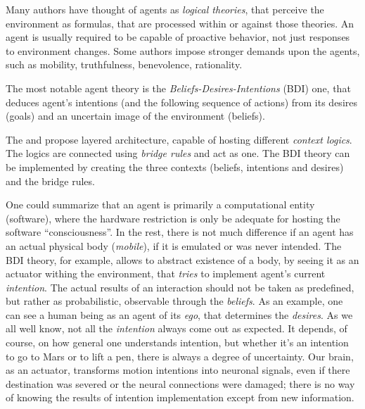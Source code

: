 \documentclass[ThesisDoc]{subfiles}
\begin{document}
Many authors have thought of agents as \emph{logical theories}, that perceive
the environment as formulas, that are processed within or against those theories.
An agent is usually required to be capable of proactive behavior, not
just responses to environment changes. Some authors impose stronger demands upon
the agents, such as mobility, truthfulness, benevolence, rationality.

The most notable agent theory is the \emph{Beliefs-Desires-Intentions} (BDI) one,
that deduces agent's intentions (and the following sequence of actions)
from its desires (goals) and an uncertain image of the environment (beliefs).


The \cite{UAB-Thesis} and \cite{PNoriega} propose layered architecture,
capable of hosting different \emph{context logics}.
The logics are connected using \emph{bridge rules} and act as one.
The BDI theory can be implemented by creating the three contexts
(beliefs, intentions and desires) and the bridge rules.

\todo{}


\bigskip
\medskip

\noindent
One could summarize that an agent is primarily a computational entity (software),
where the hardware restriction is only be adequate for hosting the software
``consciousness''. In the rest, there is not much difference if an agent has
an actual physical body (\emph{mobile}), if it is emulated or was never intended.
The BDI theory, for example, allows to abstract existence of a body,
by seeing it as an actuator withing the environment, that \emph{tries} to
implement agent's current \emph{intention}.
The actual results of an interaction should not be taken as predefined, but rather
as probabilistic, observable through the \emph{beliefs}. As an example, one can
see a human being as an agent of its \emph{ego}, that determines the \emph{desires}.
As we all well know, not all the \emph{intention} always come out as expected.
It depends, of course, on how general one understands intention, but whether
it's an intention to go to Mars or to lift a pen, there is always a degree of
uncertainty. Our brain, as an actuator, transforms motion intentions into
neuronal signals, even if there destination was severed or the neural connections
were damaged; there is no way of knowing the results of intention implementation
except from new information.
\end{document}
